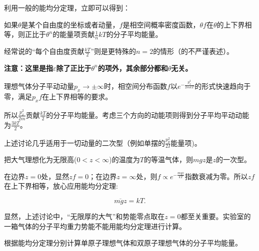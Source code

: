 \documentclass[CJK]{beamer}
\begin{document}
\begin{frame}
\bch
{\large
利用一般的能均分定理，立即可以得到：

\skipline

{\blue 如果$\theta$是某个自由度的坐标或者动量，$f$是相空间概率密度函数，$\theta f$在$\theta$的上下界相等，则正比于$\theta^n$的能量项贡献$\frac{1}{n}kT$的分子平均能量。}


\skipline

经常说的“每个自由度贡献$\frac{kT}{2}$”则是更特殊的$n=2$的情形（的不严谨表述）。


\skipline

{\bf
注意：这里是指$\varepsilon$除了正比于$\theta^n$的项外，其余部分都和$\theta$无关。}
}
\ech
\end{frame}

\begin{frame}
\bch
{\large
理想气体分子平动动量$p_x\rightarrow \pm \infty$时，相空间分布函数$f$以$e^{-\frac{p_x^2}{2mkT}}$的形式快速趋向于零，满足$p_xf$在上下界相等的要求。

\skipline

所以$\frac{p_x^2}{2m}$贡献$\frac{kT}{2}$的分子平均能量。考虑三个方向的动能项则得到分子平均平动动能为$\frac{3kT}{2}$。

\skipline

上述讨论几乎适用于一切动量的二次型（例如单摆的$\frac{p^2_\theta}{2I}$能量项)。

}
\ech
\end{frame}


\begin{frame}
\bch
    {\large
      把大气理想化为无限高($0<z<\infty$)的温度为$T$的等温气体，则$mgz$是$z$的一次型。

      在边界$z=0$处，显然$zf = 0$；在边界$z=\infty$处，则$f\propto e^{-\frac{mgz}{kT}} $指数衰减为零。所以$zf$在上下界相等，放心应用能均分定理:

      $$\overline{mgz} = kT.$$

      显然，上述讨论中，“无限厚的大气”和势能零点取在$z=0$都至关重要。实验室的一箱气体的分子平均重力势能不能用能均分定理进行计算。
}
\ech
\end{frame}


\begin{frame}
\bch
{}
{\large
 根据能均分定理分别计算单原子理想气体和双原子理想气体的分子平均能量。        
}
\ech
\end{frame}
\end{document}
